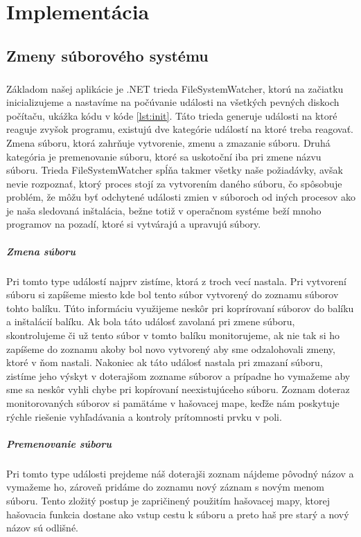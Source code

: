 \chapter{Implementácia}

\section{Zmeny súborového systému}
\paragraph{}
Základom našej aplikácie je .NET trieda FileSystemWatcher, ktorú na začiatku inicializujeme a nastavíme na počúvanie události na všetkých pevných diskoch počítaču, ukážka kódu v kóde \ref{lst:init}. Táto trieda generuje události na ktoré reaguje zvyšok programu, existujú dve kategórie událostí na ktoré treba reagovať. Zmena súboru, ktorá zahrňuje vytvorenie, zmenu a zmazanie súboru. Druhá kategória je premenovanie súboru, ktoré sa uskotoční iba pri zmene názvu súboru. Trieda FileSystemWatcher spĺňa takmer všetky naše požiadávky, avšak nevie rozpoznať, ktorý proces stojí za vytvorením daného súboru, čo spôsobuje problém, že môžu byť odchytené události zmien v súboroch od iných procesov ako je naša sledovaná inštalácia, bežne totiž v operačnom systéme beží mnoho programov na pozadí, ktoré si vytvárajú a upravujú súbory. 

\paragraph{Zmena súboru}
Pri tomto type událostí najprv zistíme, ktorá z troch vecí nastala. Pri vytvorení súboru si zapíšeme miesto kde bol tento súbor vytvorený do zoznamu súborov tohto balíku. Túto informáciu využijeme neskôr pri koprírovaní súborov do balíku a inštalácií balíku. Ak bola táto událosť zavolaná pri zmene súboru, skontrolujeme či už tento súbor v tomto balíku monitorujeme, ak nie tak si ho zapíšeme do zoznamu akoby bol novo vytvorený aby sme odzalohovali zmeny, ktoré v ňom nastali. Nakoniec ak táto událosť nastala pri zmazaní súboru, zistíme jeho výskyt v doterajšom zozname súborov a prípadne ho vymažeme aby sme sa neskôr vyhli chybe pri kopírovaní neexistujúceho súboru. Zoznam doteraz monitorovaných súborov si pamätáme v hašovacej mape, keďže nám poskytuje rýchle riešenie vyhľadávania a kontroly prítomnosti prvku v poli.

\paragraph{Premenovanie súboru}
Pri tomto type události prejdeme náš doterajši zoznam nájdeme pôvodný názov a vymažeme ho, zároveň pridáme do zoznamu nový záznam s novým menom súboru. Tento zložitý postup je zapričinený použitím hašovacej mapy, ktorej hašovacia funkcia dostane ako vstup cestu k súboru a preto haš pre starý a nový názov sú odlišné.

